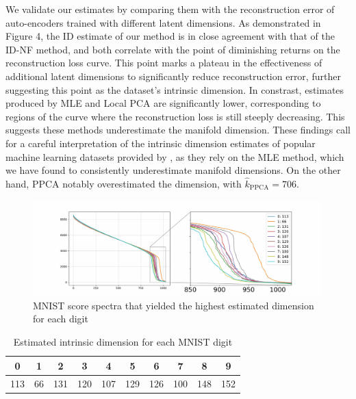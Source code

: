 We validate our estimates by comparing them with the reconstruction error of auto-encoders trained with different latent dimensions. As demonstrated in Figure 4, the ID estimate of our method is in close agreement with that of the ID-NF method, and both correlate with the point of diminishing returns on the reconstruction loss curve. This point marks a plateau in the effectiveness of additional latent dimensions to significantly reduce reconstruction error, further suggesting this point as the dataset's intrinsic dimension. In constrast, estimates produced by MLE and Local PCA are significantly lower, corresponding to regions of the curve where the reconstruction loss is still steeply decreasing. This suggests these methods underestimate the manifold dimension. These findings call for a careful interpretation of the intrinsic dimension estimates of popular machine learning datasets provided by \cite{pope2021intrinsic}, as they rely on the MLE method, which we have found to consistently underestimate manifold dimensions. On the other hand, PPCA notably overestimated the dimension, with $\hat{k}_{\text{PPCA}} = 706$.



\begin{figure}
    \centering
    \includegraphics[width=0.99\textwidth]{Chapter3/figures/image_manifolds/MNIST/mnist_spectrum.jpg}
    \caption{MNIST score spectra that yielded the highest estimated dimension for each digit}
    \label{ch3:fig:score_spectra_mnist}
\end{figure}

    
\begin{table}[ht]
    \centering
    \footnotesize
    \setlength{\tabcolsep}{4pt} 
    \renewcommand{\arraystretch}{0.9} 
    \begin{tabular}{c|c|c|c|c|c|c|c|c|c}
    \toprule
    0 & 1 & 2 & 3 & 4 & 5 & 6 & 7 & 8 & 9 \\
    \midrule
    113 & 66 & 131 & 120 & 107 & 129 & 126 & 100 & 148 & 152 \\
    \bottomrule
    \end{tabular}
    \vspace{8pt} %
    \caption{Estimated intrinsic dimension for each MNIST digit}
    \label{ch3:tab:estimated_mnist_dimensions}
    \end{table}
    
